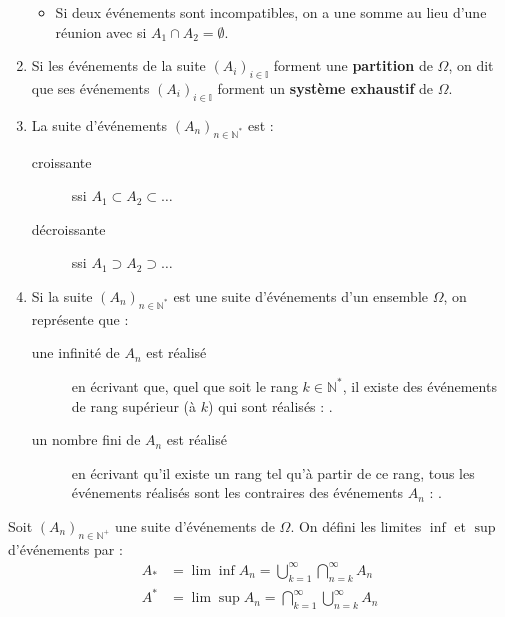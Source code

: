 \documentclass[10pt, french]{report}
\begin{document}
\begin{multicols*}{2}
\begin{definitionNOHFILLprop}
\begin{enumerate}
\begin{itemize}
		\item	Si deux événements sont incompatibles, on a une somme au lieu d'une réunion avec  si $A_{1} \cap A_{2} = \emptyset$.
		\end{itemize}
	\item	Si les événements de la suite $(A_{i})_{i \in \mathbb{I}}$ forment une \textbf{partition} de $\Omega$, on dit que ses événements $(A_{i})_{i \in \mathbb{I}}$ forment un \textbf{système exhaustif} de $\Omega$.
	\item	La suite d'événements $(A_{n})_{n \in \mathbb{N}^{\ast}}$ est : 
		\begin{description}
		\item[croissante]	ssi $A_{1} \subset A_{2} \subset \hdots$
		\item[décroissante]	ssi $A_{1} \supset A_{2} \supset \hdots$
		\end{description}
	\item	Si la suite $(A_{n})_{n \in \mathbb{N}^{\ast}}$ est une suite d'événements d'un ensemble $\Omega$, on représente que :
		\begin{description}
		\item[une infinité de $A_{n}$ est réalisé]	en écrivant que, quel que soit le rang $k \in \mathbb{N}^{\ast}$, il existe des événements de rang supérieur (à $k$) qui sont réalisés : .
		\item[un nombre fini de $A_{n}$ est réalisé]	en écrivant qu'il existe un rang tel qu'à partir de ce rang, tous les événements réalisés sont les contraires des événements $A_{n}$ : .
		\end{description}
		
\end{enumerate}
\end{definitionNOHFILLprop}

\begin{definitionNOHFILLsub}
Soit $(A_{n})_{n \in \mathbb{N}^{+}}$ une suite d'événements de $\Omega$. On défini les limites $\inf$ et $\sup$ d'événements par : 
\begin{align*}
	A_{\ast} 
	&=	\lim \inf A_{n} 
	=	\bigcup_{k = 1}^{\infty} \bigcap_{n = k}^{\infty} A_{n}	\\
	A^{\ast} 
	&=	\lim \sup A_{n} 
	=	\bigcap_{k = 1}^{\infty} \bigcup_{n = k}^{\infty} A_{n}
\end{align*}


\end{definitionNOHFILLsub}
\end{multicols*}
\end{document}

